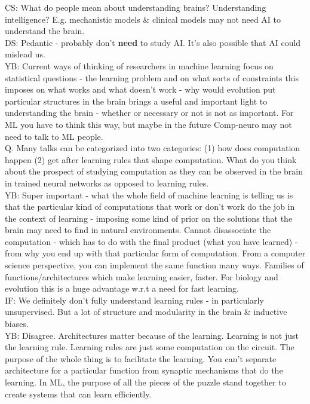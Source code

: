 \documentclass[12pt]{article}
\begin{document}
CS: What do people mean about understanding brains? Understanding intelligence? E.g. mechanistic models \&  clinical models may not need AI to understand the brain. \\

DS: Pedantic - probably don't \textbf{need} to study AI. It's also possible that AI could mislead us. \\

YB: Current ways of thinking of researchers in machine learning focus on statistical questions - the learning problem and on what sorts of constraints this imposes on what works and what doesn't work - why would evolution put particular structures in the brain brings a useful and important light to understanding the brain - whether or necessary or not is not as important. For ML you have to think this way, but maybe in the future Comp-neuro may not need to talk to ML people. \\

Q. Many talks can be categorized into two categories: (1) how does computation happen (2) get after learning rules that shape computation. What do you think about the prospect of studying computation as they can be observed in the brain in trained neural networks as opposed to learning rules. \\

YB: Super important - what the whole field of machine learning is telling us is that the particular kind of computations that work or don't work do the job in the context of learning - imposing some kind of prior on the solutions that the brain may need to find in natural environments. Cannot disassociate the computation - which has to do with the final product (what you have learned) - from why you end up with that particular form of computation. From a computer science perspective, you can implement the same function many ways. Families of functions/architectures which make learning easier, faster. For biology and evolution this is a huge advantage w.r.t a need for fast learning. \\

IF: We definitely don't fully understand learning rules - in particularly unsupervised. But a lot of structure and modularity in the brain & inductive biases. \\

YB: Disagree. Architectures matter because of the learning. Learning is not just the learning rule. Learning rules are just some computation on the circuit. The purpose of the whole thing is to facilitate the learning. You can't separate architecture for a particular function from synaptic mechanisms that do the learning. In ML, the purpose of all the pieces of the puzzle stand together to create systems that can learn efficiently. \\
\end{document}
